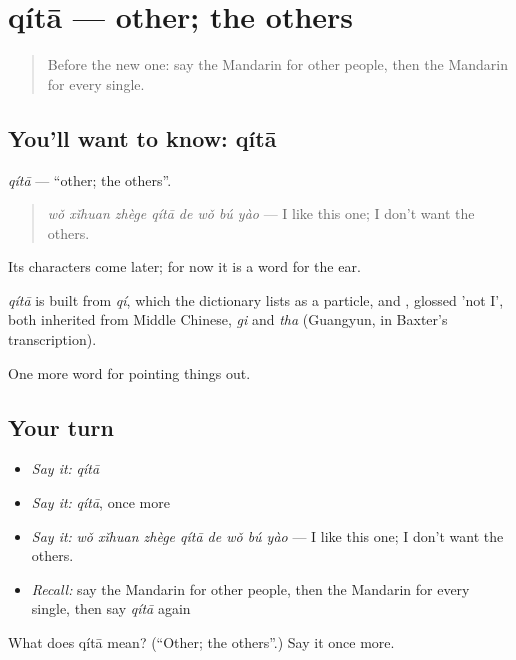 \section[qítā]{qítā — other; the others}

\label{lesson:ZH-C138-qita}



\begin{quote}
Before the new one: say the Mandarin for other people, then the Mandarin for every single.
\end{quote}

\subsection*{You'll want to know: qítā}
\emph{qítā} — \textquotedblleft{}other; the others\textquotedblright{}.

\begin{quote}
\emph{wǒ xǐhuan zhège qítā de wǒ bú yào} — I like this one; I don't want the others.
\end{quote}

Its characters come later; for now it is a word for the ear.

\begin{cousinweb}
\emph{qítā} is built from \emph{qí}, which the dictionary lists as a particle, and , glossed 'not I', both inherited from Middle Chinese, \emph{gi} and \emph{tha} (Guangyun, in Baxter's transcription).
\end{cousinweb}

\begin{grammarlens}[title={What you've built}]
One more word for pointing things out.
\end{grammarlens}

\subsection*{Your turn}
\begin{itemize}
\raggedright
  \item \emph{Say it:} \emph{qítā}
  \item \emph{Say it:} \emph{qítā}, once more
  \item \emph{Say it:} \emph{wǒ xǐhuan zhège qítā de wǒ bú yào} — I like this one; I don't want the others.
  \item \emph{Recall:} say the Mandarin for other people, then the Mandarin for every single, then say \emph{qítā} again
\end{itemize}

\begin{tcolorbox}[breakable,colback=teal!4,colframe=teal!35!black,title={Before you move on}]
What does qítā mean? (\textquotedblleft{}Other; the others\textquotedblright{}.) Say it once more.
\end{tcolorbox}
